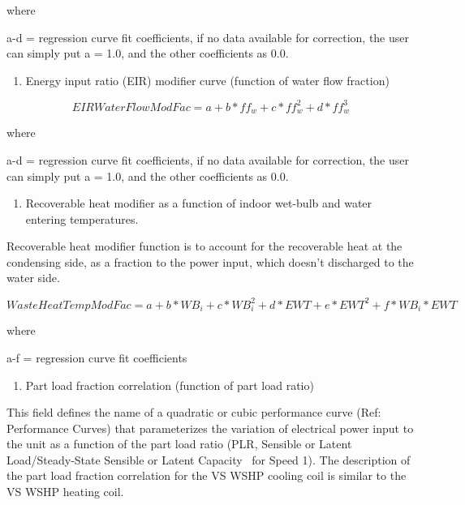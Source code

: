where

a-d = regression curve fit coefficients, if no data available for correction, the user can simply put a = 1.0, and the other coefficients as 0.0.

\begin{enumerate}
\def\labelenumi{\arabic{enumi})}
\setcounter{enumi}{5}
\tightlist
\item
  Energy input ratio (EIR) modifier curve (function of water flow fraction)
\end{enumerate}

\begin{equation}
EIRWaterFlowModFac = a + b*f{f_w} + c*ff_w^2 + d*ff_w^3
\end{equation}

where

a-d = regression curve fit coefficients, if no data available for correction, the user can simply put a = 1.0, and the other coefficients as 0.0.

\begin{enumerate}
\def\labelenumi{\arabic{enumi})}
\setcounter{enumi}{6}
\tightlist
\item
  Recoverable heat modifier as a function of indoor wet-bulb and water entering temperatures.
\end{enumerate}

Recoverable heat modifier function is to account for the recoverable heat at the condensing side, as a fraction to the power input, which doesn't discharged to the water side.

\begin{equation}
WasteHeatTempModFac = a + b*W{B_i} + c*WB_i^2 + d*EWT + e*EW{T^2} + f*W{B_i}*EWT
\end{equation}

where

a-f = regression curve fit coefficients

\begin{enumerate}
\def\labelenumi{\arabic{enumi})}
\setcounter{enumi}{7}
\tightlist
\item
  Part load fraction correlation (function of part load ratio)
\end{enumerate}

This field defines the name of a quadratic or cubic performance curve (Ref: Performance Curves) that parameterizes the variation of electrical power input to the unit as a function of the part load ratio (PLR, Sensible or Latent Load/Steady-State Sensible or Latent Capacity~ for Speed 1). The description of the part load fraction correlation for the VS WSHP cooling coil is similar to the VS WSHP heating coil.

